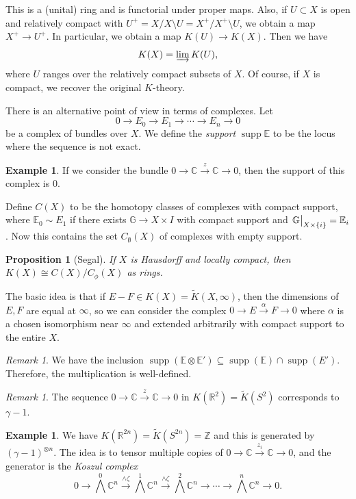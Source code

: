 \documentclass[leqno, openany]{memoir}
\newtheorem{prop}[thm]{Proposition}
\theoremstyle{definition}
\newtheorem{exm}[thm]{Example}
\theoremstyle{remark}
\newtheorem{rmk}[thm]{Remark}
\theoremstyle{plain}
\theoremstyle{definition}
\theoremstyle{remark}
\newcommand{\R}{\mathbb{R}}
\newcommand{\C}{\mathbb{C}}
\newcommand{\E}{\mathbb{E}}
\newcommand{\Z}{\mathbb{Z}}
\newcommand{\wt}[1]{\widetilde{#1}}
\DeclareMathOperator{\supp}{supp}
\begin{document}
This is a (unital) ring and is functorial under proper maps. Also, if $U \subset X$ is open and relatively compact with $U^+ = X / X \setminus U = X^+ / X^+ \setminus U$, we obtain a map $X^+ \to U^+$. In particular, we obtain a map $K(U) \to K(X)$. Then we have
\[ K(X) = \varinjlim K(U), \]
where $U$ ranges over the relatively compact subsets of $X$. Of course, if $X$ is compact, we recover the original $K$-theory.

There is an alternative point of view in terms of complexes. Let
\[ 0 \to E_0 \to E_1 \to \cdots \to E_n \to 0 \]
be a complex of bundles over $X$. We define the \textit{support} $\supp \mathbb{E}$ to be the locus where the sequence is not exact.

\begin{exm}
    If we consider the bundle $0 \to \C \xrightarrow{z} \C \to 0$, then the support of this complex is $\qty{0}$.
\end{exm}

Define $C(X)$ to be the homotopy classes of complexes with compact support, where $\E_0 \sim E_1$ if there exists $\mathbb{G} \to X \times I$ with compact support and $\eval{\mathbb{G}}_{X \times \qty{i}} = \E_i$. Now this contains the set $C_{\emptyset}(X)$ of complexes with empty support. 

\begin{prop}[Segal]
    If $X$ is Hausdorff and locally compact, then $K(X) \cong C(X) / C_{\phi}(X)$ as rings.
\end{prop}

The basic idea is that if $E - F \in K(X) = \wt{K}(X, \infty)$, then the dimensions of $E, F$ are equal at $\infty$, so we can consider the complex $0 \to E \xrightarrow{\alpha} F \to 0$ where $\alpha$ is a chosen isomorphism near $\infty$ and extended arbitrarily with compact support to the entire $X$.

\begin{rmk}
    We have the inclusion $\supp(\E \otimes \E') \subseteq \supp(\E) \cap \supp(E')$. Therefore, the multiplication is well-defined.
\end{rmk}

\begin{rmk}
    The sequence $0 \to \C \xrightarrow{z} \C \to 0$ in $K(\R^2) = \wt{K}(S^2)$ corresponds to $\gamma - 1$.
\end{rmk}

\begin{exm}
    We have $K(\R^{2n}) = \wt{K}(S^{2n}) = \Z$ and this is generated by ${(\gamma-1)}^{\otimes n}$. The idea is to tensor multiple copies of $0 \to \C \xrightarrow{z_i} \C \to 0$, and the generator is the \textit{Koszul complex}
    \[ 0 \to {\bigwedge}^0 \C^n \xrightarrow{\wedge \zeta} {\bigwedge}^1 \C^n \xrightarrow{\wedge \zeta} {\bigwedge}^2 \C^n \to \cdots \to {\bigwedge}^n \C^n \to 0. \]
\end{exm}
\end{document}
